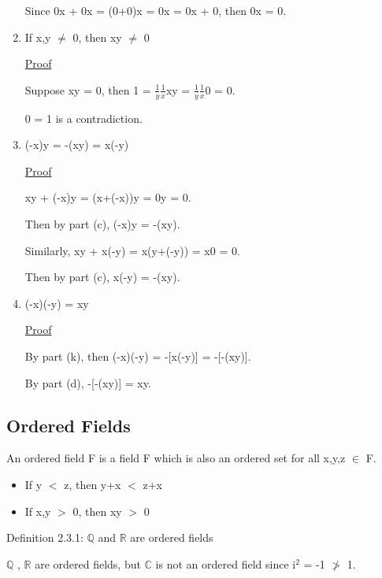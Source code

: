 \begin{enumerate}[label=(\alph*), leftmargin=2cm, itemsep=0.4em]
				Since 0x + 0x = (0+0)x = 0x = 0x + 0, then 0x = 0.
	
		\item If x,y $\not =$ 0, then xy $\not =$ 0

			{ \color{magenta} \underline{Proof} } 
		
				Suppose xy = 0, then 1 = $\frac{1}{y}\frac{1}{x}$xy
				= $\frac{1}{y}$$\frac{1}{x}$0 = 0. 

				0 = 1 is a contradiction.
	
		\item (-x)y = -(xy) = x(-y)

			{ \color{magenta} \underline{Proof} } 
		
				xy + (-x)y = (x+(-x))y = 0y = 0.

				Then by part (c), (-x)y = -(xy).

				Similarly, xy + x(-y) = x(y+(-y)) = x0 = 0.
	
				Then by part (c), x(-y) = -(xy).

		\item (-x)(-y) = xy

			{ \color{magenta} \underline{Proof} } 
		
				By part (k), then (-x)(-y) = -[x(-y)] = -[-(xy)].

				By part (d), -[-(xy)] = xy.
	\end{enumerate}





\subsection{Ordered Fields}

	\qquad An ordered field F is a field F which is also an ordered set for all x,y,z $\in$ F.

	\begin{itemize}[leftmargin=2cm, itemsep=0.4em]
		\item If y $<$ z, then y+x $<$ z+x
	
		\item If x,y $>$ 0, then xy $>$ 0
	\end{itemize}

\newpage

{ \color{blue} Definition 2.3.1: $ \mathbb{Q} $ and $ \mathbb{R} $ are ordered fields } 

	\qquad $ \mathbb{Q} $ , $ \mathbb{R} $ are ordered fields,
	but $ \mathbb{C} $ is not an ordered field since i$^2$ = -1 $\not >$ 1. \\

